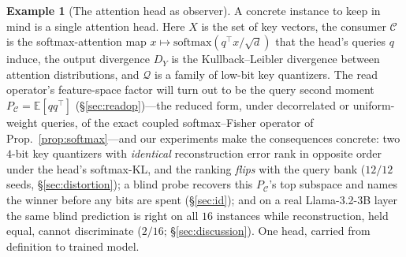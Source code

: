 \documentclass[lettersize,onecolumn]{IEEEtran}
\theoremstyle{definition}
\newtheorem{example}{Example}
\theoremstyle{remark}
\newcommand{\PC}{P_{\mathcal{C}}}
\newcommand{\E}{\mathbb{E}}
\begin{document}
\begin{leftbar}\small
\begin{example}[The attention head as observer]\label{ex:head}
A concrete instance to keep in mind is a single attention head. Here $X$ is the set of
key vectors, the consumer $\mathcal{C}$ is the softmax-attention map
$x\mapsto\mathrm{softmax}(q^\top x/\sqrt d)$ that the head's queries $q$ induce, the
output divergence $D_Y$ is the Kullback--Leibler divergence between attention
distributions, and $\mathcal{Q}$ is a family of low-bit key quantizers. The read
operator's feature-space factor will turn out to be the query second moment
$\PC=\E[qq^\top]$ (\S\ref{sec:readop})---the reduced form, under decorrelated or
uniform-weight queries, of the exact coupled softmax--Fisher operator of
Prop.~\ref{prop:softmax}---and our experiments make the consequences concrete: two $4$-bit
key quantizers with \emph{identical} reconstruction error rank in opposite order under
the head's softmax-KL, and the ranking \emph{flips} with the query bank
($12/12$ seeds, \S\ref{sec:distortion}); a blind probe recovers this $\PC$'s top
subspace and names the winner before any bits are spent (\S\ref{sec:id}); and on a
real Llama-3.2-3B layer the same blind prediction is right on all $16$ instances while
reconstruction, held equal, cannot discriminate ($2/16$; \S\ref{sec:discussion}). One
head, carried from definition to trained model.
\end{example}
\end{leftbar}
\end{document}

